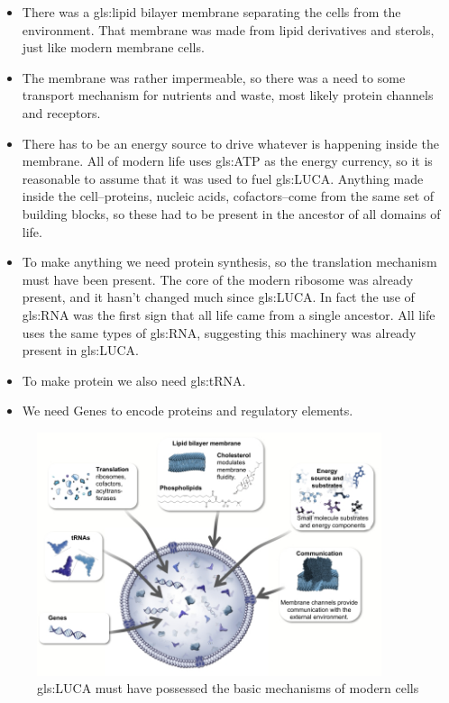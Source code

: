 \documentclass[]{article}
\begin{document}
\begin{itemize}
	\item There was a \gls{gls:lipid} bilayer membrane separating the cells from the environment. That membrane was made from lipid derivatives and sterols, just like modern membrane cells.
	\item The membrane was rather impermeable, so there was a need to some transport mechanism for nutrients and waste, most likely protein channels and receptors.
	\item There has to be an energy source to drive whatever is happening inside the membrane. All of modern life uses \gls{gls:ATP} as the energy currency, so it is reasonable to assume that it was used to fuel \gls{gls:LUCA}. Anything made inside the cell--proteins, nucleic acids, cofactors--come from the same set of building blocks, so these had to be present in the ancestor of all domains of life.
	\item To make anything we need protein synthesis, so the translation mechanism must have been present. The core of the modern ribosome was already present, and it hasn't changed much since \gls{gls:LUCA}. In fact the use of \gls{gls:RNA} was the first sign that all life came from a single ancestor. All life uses the same types of \gls{gls:RNA}, suggesting this machinery was already present in \gls{gls:LUCA}.
	\item To make protein we also need \gls{gls:tRNA}.
	\item We need Genes to encode proteins and regulatory elements.
\end{itemize}

\begin{figure}[H]
	\caption{\gls{gls:LUCA} must have possessed the basic mechanisms of  modern cells}\label{fig:LUCA_Attributes}
	\includegraphics[width=0.9\textwidth]{LUCA_Attributes}
\end{figure}
\end{document}
